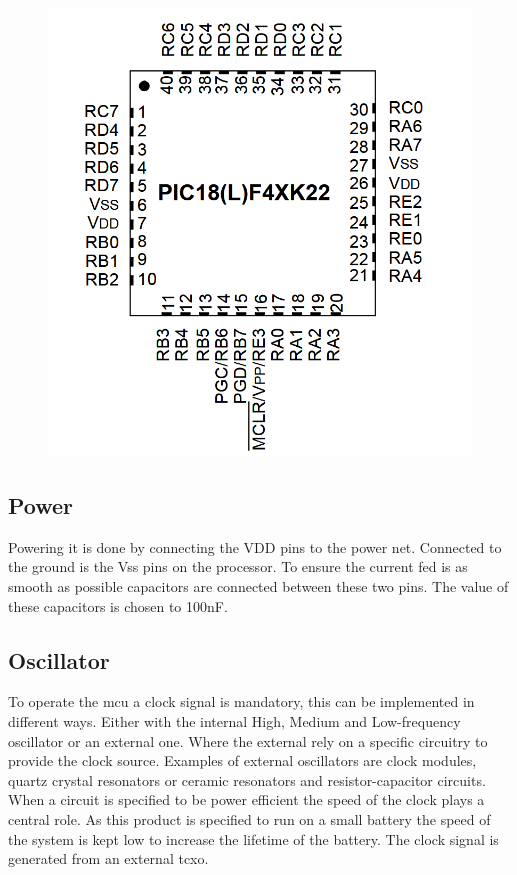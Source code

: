 \begin{figure}[H] 
\centering 
\includegraphics[width=.7\linewidth]{Figures/Pic18_pinout} 
\label{Pic18_Pinout} 
\end{figure} 



\subsection{Power}
Powering it is done by connecting the VDD pins to the power net. Connected to the ground is the Vss pins on the processor. To ensure the current fed is as smooth as possible capacitors are connected between these two pins. The value of these capacitors is chosen to 100nF.  

\subsection{Oscillator}
To operate the \gls{mcu} a clock signal is mandatory, this can be implemented in different ways. Either with the internal High, Medium and Low-frequency oscillator or an external one. Where the external rely on a specific circuitry to provide the clock source. Examples of external oscillators are clock modules, quartz crystal resonators or ceramic resonators and resistor-capacitor circuits. When a circuit is specified to be power efficient the speed of the clock plays a central role. As this product is specified to run on a small battery the speed of the system is kept low to increase the lifetime of the battery. The clock signal is generated from an external \gls{tcxo}.


